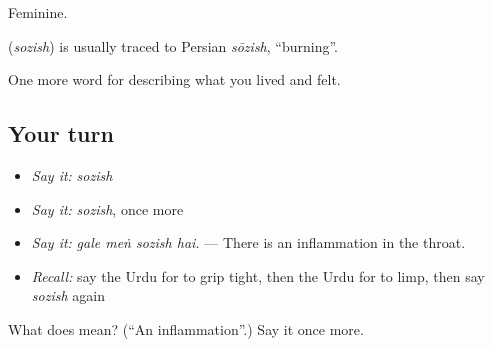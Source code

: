 Feminine.

\begin{cousinweb}
\textbf{} (\emph{sozish}) is usually traced to Persian \emph{sōzish}, \textquotedblleft{}burning\textquotedblright{}.
\end{cousinweb}

\begin{grammarlens}[title={What you've built}]
One more word for describing what you lived and felt.
\end{grammarlens}

\subsection*{Your turn}
\begin{itemize}
\raggedright
  \item \emph{Say it:} \emph{sozish}
  \item \emph{Say it:} \emph{sozish}, once more
  \item \emph{Say it:} \emph{gale meṅ sozish hai.} — There is an inflammation in the throat.
  \item \emph{Recall:} say the Urdu for to grip tight, then the Urdu for to limp, then say \emph{sozish} again
\end{itemize}

\begin{tcolorbox}[breakable,colback=teal!4,colframe=teal!35!black,title={Before you move on}]
What does  mean? (\textquotedblleft{}An inflammation\textquotedblright{}.) Say it once more.
\end{tcolorbox}
